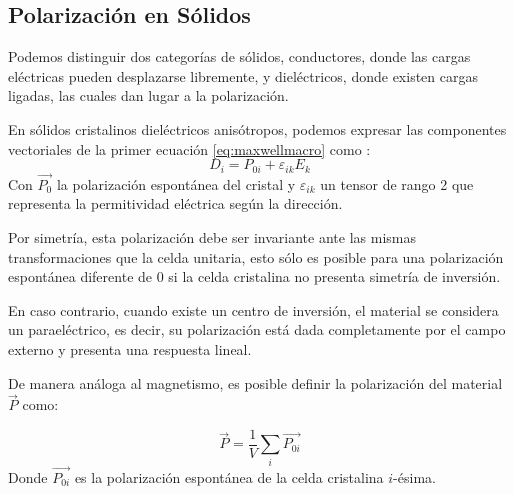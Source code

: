 \documentclass[../main.tex]{subfiles}
\begin{document}
\subsection{Polarización en Sólidos}
Podemos distinguir dos categorías de sólidos, conductores, donde las cargas eléctricas pueden desplazarse libremente, y dieléctricos, donde existen cargas ligadas, las cuales dan lugar a la polarización.

En sólidos cristalinos dieléctricos anisótropos, podemos expresar las componentes vectoriales de la primer ecuación \ref{eq:maxwellmacro} como \cite{Landau1984}:
\begin{equation}
    D_i=P_{0i}+\varepsilon_{ik}E_k
    \label{eq:macroelec}
\end{equation}
Con $\vec{P_{0}}$ la polarización espontánea del cristal y $\varepsilon_{ik}$ un tensor de rango 2 que representa la permitividad eléctrica según la dirección.

Por simetría, esta polarización debe ser invariante ante las mismas transformaciones que la celda unitaria, esto sólo es posible para una polarización espontánea diferente de 0 si la celda cristalina no presenta simetría de inversión.

En caso contrario, cuando existe un centro de inversión, el material se considera un paraeléctrico, es decir, su polarización está dada completamente por el campo externo y presenta una respuesta lineal.

De manera análoga al magnetismo, es posible definir la polarización del material $\vec{P}$ como:

\begin{equation}
    \vec{P}=\dfrac{1}{V}\sum_{i}\vec{P_{0i}}
    \label{eq:polarizacionmicromacro}
\end{equation}
Donde $\vec{P_{0i}}$ es la polarización espontánea de la celda cristalina $i$-ésima.
\end{document}
